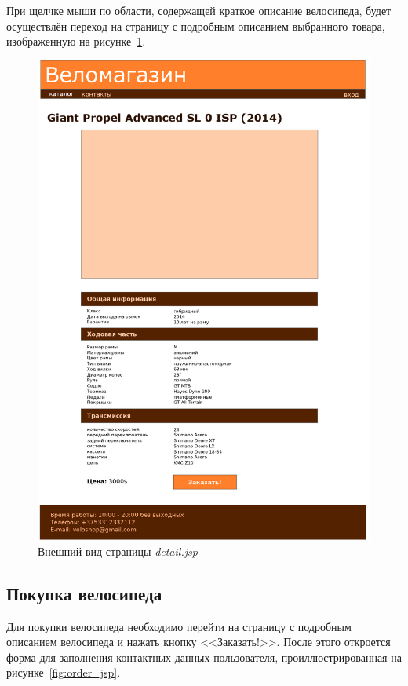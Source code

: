 \pagebreak

При щелчке мыши по области, содержащей краткое описание велосипеда,
будет осуществлён переход на страницу с подробным описанием выбранного товара,
изображенную на рисунке~\ref{fig:detail_jsp}.

\begin{figure}[h]
  \centering
  \includegraphics[width=125mm]{pic/detail_template.png}
  \caption{Внешний вид страницы \textit{detail.jsp}}
  \label{fig:detail_jsp}
\end{figure}

\pagebreak

\subsection{Покупка велосипеда}

Для покупки велосипеда необходимо перейти на страницу с подробным описанием
велосипеда и нажать кнопку <<Заказать!>>. После этого откроется форма для заполнения
контактных данных пользователя, проиллюстрированная на рисунке~\ref{fig:order_jsp}.

